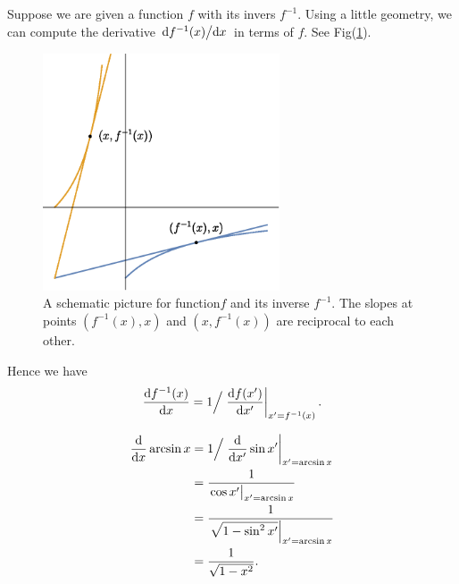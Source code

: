 \documentclass[10pt]{article}
\begin{document}
Suppose we are given a function $f$ with its invers $f^{-1}$. Using a little geometry, we can compute the derivative $\dv*{f^{-1}(x)}{x}$ in terms of $f$. See Fig(\ref{fig: 1}).

\begin{figure}[H]
	\centering
	\includegraphics[height = 7cm]{./graphs/inverse_function.eps}
	\caption{A schematic picture for function$f$ and its inverse $f^{-1}$. The slopes at points $(f^{-1}(x),x)$ and $(x,f^{-1}(x))$ are reciprocal to each other.}
	\label{fig: 1}
\end{figure}

Hence we have
\begin{equation}
	\dv{f^{-1}(x)}{x} = 1\Big{/}\eval{\dv{f(x')}{x'}}_{x' = f^{-1}(x)}.
\end{equation}

\begin{example}
	\begin{align*}
		\dv{x} \arcsin{x} &= 1\Big{/}\eval{\dv{x'} \sin{x'}}_{x' = \arcsin{x}} \\
		&= \frac{1}{\eval{\cos{x'}}_{x' = \arcsin{x}}} \\
		&= \frac{1}{\eval{\sqrt{1-\sin^2{x'}}}_{x' = \arcsin{x}}} \\
		&= \frac{1}{\sqrt{1-x^2}}.
	\end{align*}
\end{example}
\end{document}
